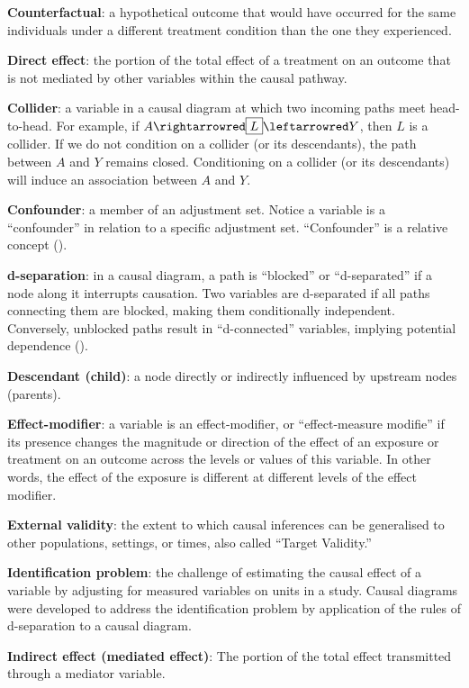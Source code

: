 \documentclass[
  singlecolumn]{article}
\begin{document}
\textbf{Counterfactual}: a hypothetical outcome that would have occurred
for the same individuals under a different treatment condition than the
one they experienced.

\textbf{Direct effect}: the portion of the total effect of a treatment
on an outcome that is not mediated by other variables within the causal
pathway.

\textbf{Collider}: a variable in a causal diagram at which two incoming
paths meet head-to-head. For example, if
\(A \rightarrowred \boxed{L} \leftarrowred Y\), then \(L\) is a
collider. If we do not condition on a collider (or its descendants), the
path between \(A\) and \(Y\) remains closed. Conditioning on a collider
(or its descendants) will induce an association between \(A\) and \(Y\).

\textbf{Confounder}: a member of an adjustment set. Notice a variable is
a ``confounder'' in relation to a specific adjustment set.
``Confounder'' is a relative concept ().

\textbf{d-separation}: in a causal diagram, a path is ``blocked'' or
``d-separated'' if a node along it interrupts causation. Two variables
are d-separated if all paths connecting them are blocked, making them
conditionally independent. Conversely, unblocked paths result in
``d-connected'' variables, implying potential dependence
().

\textbf{Descendant (child)}: a node directly or indirectly influenced by
upstream nodes (parents).

\textbf{Effect-modifier}: a variable is an effect-modifier, or
``effect-measure modifie'' if its presence changes the magnitude or
direction of the effect of an exposure or treatment on an outcome across
the levels or values of this variable. In other words, the effect of the
exposure is different at different levels of the effect modifier.

\textbf{External validity}: the extent to which causal inferences can be
generalised to other populations, settings, or times, also called
``Target Validity.''

\textbf{Identification problem}: the challenge of estimating the causal
effect of a variable by adjusting for measured variables on units in a
study. Causal diagrams were developed to address the identification
problem by application of the rules of d-separation to a causal diagram.

\textbf{Indirect effect (mediated effect)}: The portion of the total
effect transmitted through a mediator variable.
\end{document}
